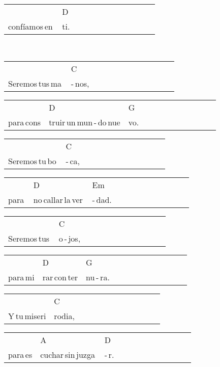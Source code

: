 \begin{multicols}{2}
\begin{minipage}{\columnwidth}
\noindent
\begin{tabular}{llllllllllll}
&D\\
confíamos\,en\,&ti.
\end{tabular}
\end{minipage}\\

\noindent
\begin{minipage}{\columnwidth}
\noindent
\noindent
\begin{tabular}{llllllllllll}
&C\\
Seremos\,tus\,ma\,&-\,nos,
\end{tabular}

\noindent
\begin{tabular}{llllllllllll}
&D&G\\
para\,cons&truir\,un\,mun\,-\,do\,nue&vo.
\end{tabular}

\noindent
\begin{tabular}{llllllllllll}
&C\\
Seremos\,tu\,bo\,&-\,ca,
\end{tabular}

\noindent
\begin{tabular}{llllllllllll}
&D&Em\\
para\,&no\,callar\,la\,ver\,&-\,dad.
\end{tabular}

\noindent
\begin{tabular}{llllllllllll}
&C\\
Seremos\,tus\,&o\,-\,jos,
\end{tabular}

\noindent
\begin{tabular}{llllllllllll}
&D&G\\
para\,mi&rar\,con\,ter&nu\,-\,ra.
\end{tabular}

\noindent
\begin{tabular}{llllllllllll}
&C\\
Y\,tu\,miseri&rodia,
\end{tabular}

\noindent
\begin{tabular}{llllllllllll}
&A&D\\
para\,es&cuchar\,sin\,juzga\,&-\,r.
\end{tabular}
\end{minipage}\\


\chorus{}

\end{multicols}